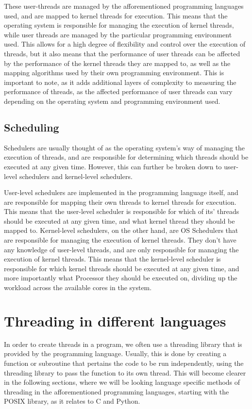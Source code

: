 \documentclass[12pt,a4paper]{article}
\begin{document}
These user-threads are managed by the afforementioned programming languages used, and are mapped to kernel threads for execution. This means that the operating system is responsible for managing the execution of kernel threads, while user threads are managed by the particular programming environment used. This allows for a high degree of flexibility and control over the execution of threads, but it also means that the performance of user threads can be affected by the performance of the kernel threads they are mapped to, as well as the mapping algorithms used by their own programming environment. This is important to note, as it adds additional layers of complexity to measuring the performance of threads, as the affected performance of user threads can vary depending on the operating system and programming environment used.

\subsection{Scheduling}

Schedulers are usually thought of as the operating system's way of managing the execution of threads, and are responsible for determining which threads should be executed at any given time. However, this can further be broken down to user-level schedulers and kernel-level schedulers\parencite[pp. 154-155]{Rauber2023}.

User-level schedulers are implemented in the programming language itself, and are responsible for mapping their own threads to kernel threads for execution. This means that the user-level scheduler is responsible for which of its' threads should be executed at any given time, and what kernel thread they should be mapped to. Kernel-level schedulers, on the other hand, are OS Schedulers that are responsible for managing the execution of kernel threads. They don't have any knowledge of user-level threads, and are only responsible for managing the execution of kernel threads. This means that the kernel-level scheduler is responsible for which kernel threads should be executed at any given time, and more importantly what Processor they should be executed on, dividing up the workload across the available cores in the system.

\section{Threading in different languages}

In order to create threads in a program, we often use a threading library that is provided by the programming language. Usually, this is done by creating a function or subroutine that pertains the code to be run independently, using the threading library to pass the function to its own thread. This will become clearer in the following sections, where we will be looking language specific methods of threading in the afforementioned programming languages, starting with the POSIX library, as it relates to C and Python.
\end{document}
